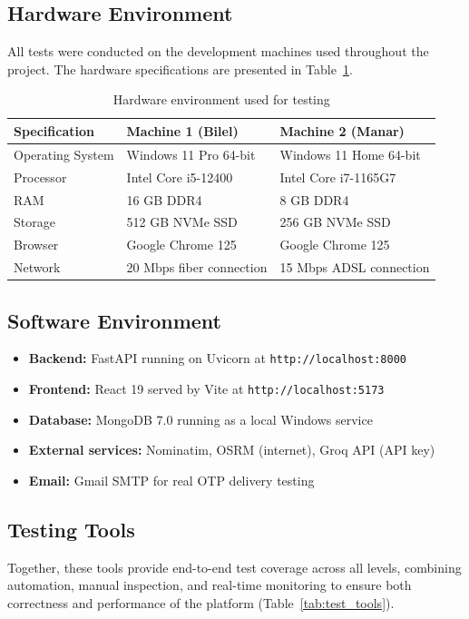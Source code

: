 \subsection{Hardware Environment}

All tests were conducted on the development machines used throughout the project. The hardware specifications are presented in Table~\ref{tab:hardware}.

\begin{table}[H]
\caption{Hardware environment used for testing}
\centering
\renewcommand{\arraystretch}{1.4}
\begin{tabular}{|l|l|l|}
\hline
\rowcolor{cyan!20}
\textbf{Specification} & \textbf{Machine 1 (Bilel)} & \textbf{Machine 2 (Manar)} \\
\hline
Operating System & Windows 11 Pro 64-bit & Windows 11 Home 64-bit \\
\hline
Processor & Intel Core i5-12400 & Intel Core i7-1165G7 \\
\hline
RAM & 16 GB DDR4 & 8 GB DDR4 \\
\hline
Storage & 512 GB NVMe SSD & 256 GB NVMe SSD \\
\hline
Browser & Google Chrome 125 & Google Chrome 125 \\
\hline
Network & 20 Mbps fiber connection & 15 Mbps ADSL connection \\
\hline
\end{tabular}
\label{tab:hardware}
\end{table}

\subsection{Software Environment}

\begin{itemize}[noitemsep]
    \item \textbf{Backend:} FastAPI running on Uvicorn at \texttt{http://localhost:8000}
    \item \textbf{Frontend:} React 19 served by Vite at \texttt{http://localhost:5173}
    \item \textbf{Database:} MongoDB 7.0 running as a local Windows service
    \item \textbf{External services:} Nominatim, OSRM (internet), Groq API (API key)
    \item \textbf{Email:} Gmail SMTP for real OTP delivery testing
\end{itemize}

\subsection{Testing Tools}
Together, these tools provide end-to-end test coverage across all levels, combining automation, manual inspection, and real-time monitoring to ensure both correctness and performance of the platform (Table~\ref{tab:test_tools}).

